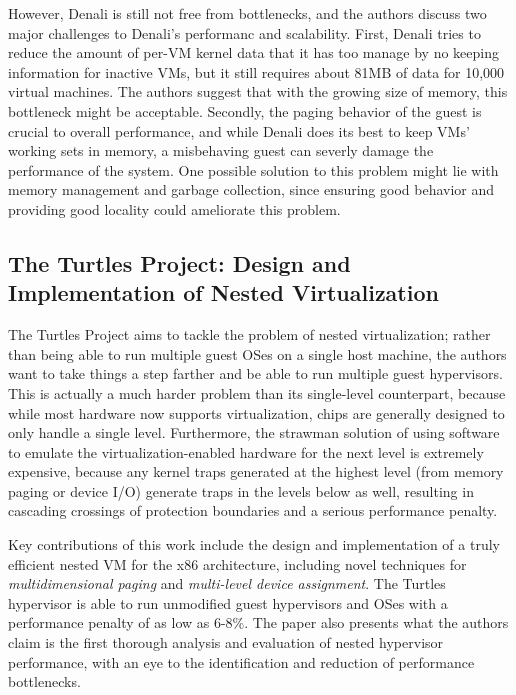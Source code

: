 \documentclass[letterpaper, twocolumn]{article}
\begin{document}
However, Denali is still not free from bottlenecks, and the authors discuss two major challenges to
Denali's performanc and scalability. First, Denali tries to reduce the amount of per-VM kernel data
that it has too manage by no keeping information for inactive VMs, but it still requires about 81MB
of data for 10,000 virtual machines. The authors suggest that with the growing size of memory,
this bottleneck might be acceptable. Secondly, the paging behavior of the guest is crucial to overall performance,
and while Denali does its best to keep VMs' working sets in memory, a misbehaving guest can severly damage the
performance of the system. One possible solution to this problem might lie with memory management 
and garbage collection, since ensuring good behavior and providing good locality could ameliorate this problem.


\subsection{The Turtles Project: Design and Implementation of Nested Virtualization}
\label{sec:summaries/turtles}

The Turtles Project \cite{ref:turtles} aims to tackle the problem of
nested virtualization; rather than being able to run multiple guest OSes
on a single host machine, the authors want to take things a step farther
and be able to run multiple guest hypervisors.  This is actually a
much harder problem than its single-level counterpart, because while
most hardware now supports virtualization, chips are generally designed
to only handle a single level.  Furthermore, the strawman solution of
using software to emulate the virtualization-enabled hardware for the next level is
extremely expensive, because any kernel traps generated at the highest
level (from memory paging or device I/O) generate traps in the levels
below as well, resulting in cascading crossings of protection
boundaries and a serious performance penalty.

Key contributions of this work include the design and implementation
of a truly efficient nested VM for the x86 architecture, including novel
techniques for \emph{multidimensional paging} and
\emph{multi-level device assignment}.  The Turtles hypervisor is able to
run unmodified guest hypervisors and OSes with a performance penalty of
as low as 6-8\%.  The paper also presents what the authors claim is the
first thorough analysis and evaluation of nested hypervisor performance,
with an eye to the identification and reduction of performance bottlenecks.
\end{document}
